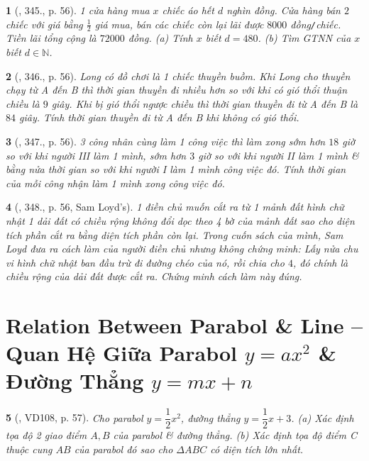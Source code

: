 \documentclass{article}
\newtheorem{baitoan}{}
\begin{document}
\begin{baitoan}[\cite{Binh_Toan_9_tap_2}, 345., p. 56]
	1 cửa hàng mua $x$ chiếc áo hết $d$ nghìn đồng. Cửa hàng bán $2$ chiếc với giá bằng $\frac{1}{2}$ giá mua, bán các chiếc còn lại lãi được $8000$ đồng{\tt/}chiếc. Tiền lãi tổng cộng là $72000$ đồng. (a) Tính $x$ biết $d = 480$. (b) Tìm {\rm GTNN} của $x$ biết $d\in\mathbb{N}$.
\end{baitoan}

\begin{baitoan}[\cite{Binh_Toan_9_tap_2}, 346., p. 56]
	Long có đồ chơi là 1 chiếc thuyền buồm. Khi Long cho thuyền chạy từ A đến B thì thời gian thuyền đi nhiều hơn so với khi có gió thổi thuận chiều là $9$ giây. Khi bị gió thổi ngược chiều thì thời gian thuyền đi từ A đến B là $84$ giây. Tính thời gian thuyền đi từ A đến B khi không có gió thổi.
\end{baitoan}

\begin{baitoan}[\cite{Binh_Toan_9_tap_2}, 347., p. 56]
	3 công nhân cùng làm 1 công việc thì làm xong sớm hơn $18$ giờ so với khi người III làm 1 mình, sớm hơn $3$ giờ so với khi người II làm 1 mình \& bằng nửa thời gian so với khi người I làm 1 mình công việc đó. Tính thời gian của mỗi công nhận làm 1 mình xong công việc đó.
\end{baitoan}

\begin{baitoan}[\cite{Binh_Toan_9_tap_2}, 348., p. 56, Sam Loyd's]
	1 điền chủ muốn cắt ra từ 1 mảnh đất hình chữ nhật 1 dải đất có chiều rộng không đổi dọc theo 4 bờ của mảnh đất sao cho diện tích phần cắt ra bằng diện tích phần còn lại. Trong cuốn sách của mình, Sam Loyd đưa ra cách làm của người điền chủ nhưng không chứng minh: Lấy nửa chu vi hình chữ nhật ban đầu trừ đi đường chéo của nó, rồi chia cho $4$, đó chính là chiều rộng của dải đất được cắt ra. Chứng minh cách làm này đúng.
\end{baitoan}


\section{Relation Between Parabol \& Line -- Quan Hệ Giữa Parabol $y = ax^2$ \& Đường Thẳng $y = mx + n$}

\begin{baitoan}[\cite{Binh_Toan_9_tap_2}, VD108, p. 57]
	Cho parabol $y = \dfrac{1}{2}x^2$, đường thẳng $y = \dfrac{1}{2}x + 3$. (a) Xác định tọa độ 2 giao điểm $A,B$ của parabol \& đường thẳng. (b) Xác định tọa độ điểm C thuộc cung $AB$ của parabol đó sao cho $\Delta ABC$ có diện tích lớn nhất.
\end{baitoan}
\end{document}
